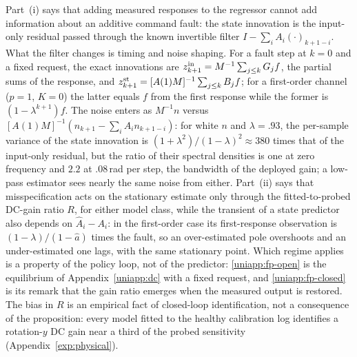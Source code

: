 Part~(i) says that adding measured responses to the regressor cannot add
information about an additive command fault: the state innovation is the
input-only residual passed through the known invertible filter
$I-\sum_iA_i(\cdot)_{k+1-i}$. What the filter changes is timing and noise
shaping. For a fault step at $k=0$ and a fixed request, the exact innovations
are $z^{\rm in}_{k+1}=M^{-1}\sum_{j\le k}G_jf$, the partial sums of the
response, and $z^{\rm st}_{k+1}=[A(1)M]^{-1}\sum_{j\le k}B_jf$; for a
first-order channel ($p=1$, $K=0$) the latter equals $f$ from the first
response while the former is $(1-\lambda^{k+1})f$. The noise enters as
$M^{-1}n$ versus $[A(1)M]^{-1}(n_{k+1}-\sum_iA_in_{k+1-i})$: for white $n$ and
$\lambda=.93$, the per-sample variance of the state innovation is
$(1+\lambda^2)/(1-\lambda)^2\approx380$ times that of the input-only residual,
but the ratio of their spectral densities is one at zero frequency and $2.2$ at
$.08$\,rad per step, the bandwidth of the deployed gain; a low-pass estimator
sees nearly the same noise from either. Part~(ii) says that misspecification
acts on the stationary estimate only through the fitted-to-probed DC-gain
ratio $R$, for either model class, while the transient of a state predictor
also depends on $\widehat A_i-A_i$: in the first-order case its first-response
observation is $(1-\lambda)/(1-\hat a)$ times the fault, so an over-estimated
pole overshoots and an under-estimated one lags, with the same stationary
point. Which regime applies is a property of the policy loop, not of the
predictor: \eqref{uniapp:fp-open} is the equilibrium of Appendix~\ref{uniapp:dc}
with a fixed request, and \eqref{uniapp:fp-closed} is its remark that the gain
ratio emerges when the measured output is restored. The bias in $R$ is an
empirical fact of closed-loop identification, not a consequence of the
proposition: every model fitted to the healthy calibration log identifies a
rotation-$y$ DC gain near a third of the probed sensitivity
(Appendix~\ref{exp:physical}).

